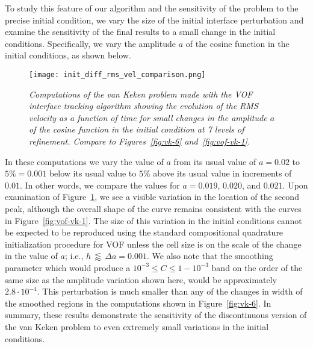 To study this feature of our algorithm and the sensitivity of the problem to
the precise initial condition, we vary the size of the initial interface
perturbation and examine the sensitivity of the final results to a small change
in the initial conditions.
Specifically, we vary the amplitude $a$ of the cosine function in the initial conditions, as 
shown below.



\begin{figure}[htb]
    \centering
    \texttt{[image: init\_diff\_rms\_vel\_comparison.png]}
    \caption{\it Computations of the van Keken problem made with the VOF
        interface tracking algorithm showing the evolution of the RMS velocity
        as a function of time for small changes in the amplitude $a$ of the
        cosine function in the initial condition at 7 levels of refinement.
        Compare to Figures~\ref{fig:vk-6} and~\ref{fig:vof-vk-1}.
    }
    \label{fig:vof-vk-3}
\end{figure}

In these computations we vary the value of $a$ from its usual value of $a = 0.02$ to 
$5\% = 0.001$ below its usual value to $5\%$ above its usual value in increments of $0.01$.
In other words, we compare the values for $a =0.019$, $0.020$, and $0.021$.
Upon examination of Figure~\ref{fig:vof-vk-3}, we see a visible variation in the location of 
the second peak, although the overall shape of the curve remains consistent with the curves 
in Figure~\ref{fig:vof-vk-1}.
The size of this variation in the initial conditions cannot be expected to be reproduced using 
the standard compositional quadrature initialization procedure for VOF unless the cell size is on the scale 
of the change in the value of $a$; i.e., $h \, \lessapprox \, \Delta a = 0.001$.
We also note that the smoothing parameter which would produce a
$10^{-3}\leq C \leq 1 - 10^{-3}$ band on the order of the same size as the
amplitude variation shown here, would be approximately $2.8 \cdot 10^{-4}$.
This perturbation is much smaller than any of the changes in width of the smoothed regions in 
the computations shown in Figure~\ref{fig:vk-6}.
In summary, these results demonstrate the sensitivity of the discontinuous version of the van 
Keken problem to even extremely small variations in the initial conditions.
